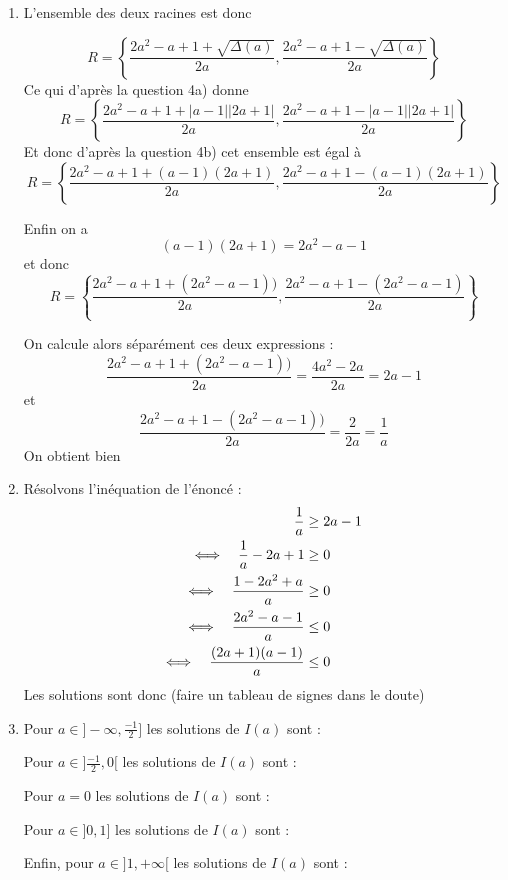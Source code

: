 \documentclass[a4paper, 11pt]{article}
\begin{document}
\begin{correction}
\begin{enumerate}
        \item L'ensemble des deux racines est donc 

        $$ R=\left\{\frac{2a^2-a+1 +\sqrt{\Delta(a)} }{2a}, \frac{2a^2-a+1-\sqrt{\Delta(a)} }{2a} \right\}$$
        Ce qui d'après la question 4a) donne 
               $$ R=\left\{\frac{2a^2-a+1 +|a-1||2a+1| }{2a}, \frac{2a^2-a+1-|a-1||2a+1| }{2a} \right\}$$ 
        Et donc d'après la question 4b) cet ensemble est égal à 
                  $$R= \left\{\frac{2a^2-a+1 +(a-1)(2a+1) }{2a}, \frac{2a^2-a+1-(a-1)(2a+1) }{2a} \right\}$$      


        Enfin on a $$(a-1)(2a+1) = 2a^2-a-1$$ et donc 
                  $$R= \left\{\frac{2a^2-a+1 +(2a^2-a-1)) }{2a}, \frac{2a^2-a+1 -(2a^2-a-1) }{2a} \right\}$$          

    On calcule alors séparément ces deux expressions : 
    $$\frac{2a^2-a+1 +(2a^2-a-1)) }{2a}  = \frac{4a^2-2a }{2a}=2a-1$$
    et 
    $$\frac{2a^2-a+1 -(2a^2-a-1)) }{2a}  = \frac{2 }{2a}=\frac{1}{a}$$
    On obtient bien 


    \item  Résolvons l'inéquation de l'énoncé :
    \begin{align*}
        \frac{1}{a} &\geq 2a-1 \\
        \Longleftrightarrow \quad \frac{1}{a}-2a+1 &\geq 0 \\
        \Longleftrightarrow \quad \frac{1-2a^2+a}{a} &\geq 0 \\
        \Longleftrightarrow \quad \frac{2a^2-a-1}{a} &\leq 0 \\
        \Longleftrightarrow \quad \frac{(2a+1)(a-1)}{a} &\leq 0 
    \end{align*}
    Les solutions sont donc (faire un tableau de signes dans le doute)
\conclusion{$\cS=]-\infty,\frac{-1}{2}]\cup ]0,1] $}

    \item 
    Pour $a \in ]-\infty,\frac{-1}{2}] $ les solutions de $I(a)$ sont :

     Pour $a \in ]\frac{-1}{2},0[ $ les solutions de $I(a)$ sont :

     Pour $a =0 $ les solutions de $I(a)$ sont :
    \conclusion{ $\cS_0 = ]-\infty , -1]$}

     Pour $a \in ]0,1] $ les solutions de $I(a)$ sont :
    \conclusion{ $ \cS_a =]-\infty, r_2(a)]\cup [r_1(a),+\infty[ $}   

    Enfin,  pour $a \in ]1,+\infty[ $ les solutions de $I(a)$ sont :
    \conclusion{ $ \cS_a =]-\infty, r_1(a)]\cup [r_2(a),+\infty[ $}   
    
    
    
    \end{enumerate}
\end{correction}
\end{document}
